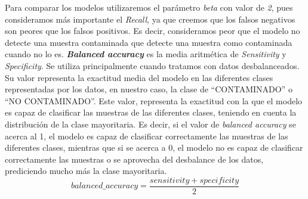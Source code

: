 Para comparar los modelos utilizaremos el parámetro \textit{beta} con valor de \textit{2}, pues consideramos más importante el \textit{Recall}, ya que creemos que los falsos negativos son peores que los falsos positivos. Es decir, consideramos peor que el modelo no detecte una muestra contaminada que detecte una muestra como contaminada cuando no lo es. 
\textit{\textbf{Balanced accuracy}} es la media aritmética de \textit{Sensitivity} y \textit{Specificity}. Se utiliza principalmente cuando tratamos con datos desbalanceados.\ \cite{Balanced44:online} Su valor representa la exactitud media del modelo en las diferentes clases representadas por los datos, en nuestro caso, la clase de ``CONTAMINADO'' o ``NO CONTAMINADO''. Este valor, representa la exactitud con la que el modelo es capaz de clasificar las muestras de las diferentes clases, teniendo en cuenta la distribución de la clase mayoritaria. Es decir, si el valor de \textit{balanced accuracy} se acerca al 1, el modelo es capaz de clasificar correctamente las muestras de las diferentes clases, mientras que si se acerca a 0, el modelo no es capaz de clasificar correctamente las muestras o se aprovecha del desbalance de los datos, prediciendo mucho más la clase mayoritaria.
\begin{equation}
    balanced\_accuracy =\frac{sensitivity + specificity}{2}
\end{equation}
